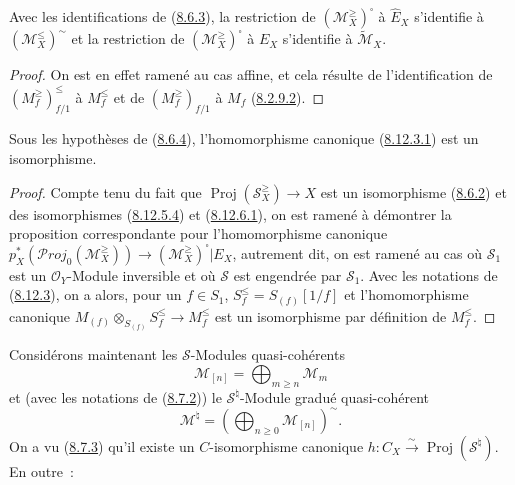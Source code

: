 \begin{corollary}[8.12.7]
\label{II.8.12.7-fr}
Avec les identifications de \textup{(\hyperref[II.8.6.3-fr]{8.6.3})}, la restriction
de $(\mathcal{M}_X^{\geq})^{\square}$ à $\widehat{E}_X$ s'identifie à
$(\mathcal{M}_X^{\leq})^{\sim}$ et la restriction de
$(\mathcal{M}_X^{\geq})^{\square}$ à $E_X$ s'identifie à
$\widetilde{\mathcal{M}}_X$.
\end{corollary}

\begin{proof}
On est en effet ramené au cas affine, et cela résulte de l'identification de
$(M_f^{\geq})_{f/1}^{\leq}$ à $M_f^{\leq}$ et de
$(M_f^{\geq})_{f/1}$ à $M_f$ (\hyperref[II.8.2.9.2-fr]{8.2.9.2}).
\end{proof}

\begin{proposition}[8.12.8]
\label{II.8.12.8-fr}
Sous les hypothèses de \textup{(\hyperref[II.8.6.4-fr]{8.6.4})}, l'homomorphisme
canonique \textup{(\hyperref[II.8.12.3.1-fr]{8.12.3.1})} est un isomorphisme.
\end{proposition}

\begin{proof}
Compte tenu du fait que $\operatorname{Proj}(\mathcal{S}_X^{\geq})\to X$
est un isomorphisme (\hyperref[II.8.6.2-fr]{8.6.2}) et des
isomorphismes (\hyperref[II.8.12.5.4-fr]{8.12.5.4}) et
(\hyperref[II.8.12.6.1-fr]{8.12.6.1}), on est ramené à démontrer la
proposition correspondante pour l'homomorphisme canonique
$p_X^*(\mathcal{P}\mathit{roj}_0(\mathcal{M}_X^{\geq}))
\to(\mathcal{M}_X^{\geq})^{\square}|E_X$, autrement dit, on est
ramené au cas où $\mathcal{S}_1$ est un $\mathcal{O}_Y$-Module inversible et
où $\mathcal{S}$ est engendrée par $\mathcal{S}_1$. Avec les notations de
(\hyperref[II.8.12.3-fr]{8.12.3}), on a alors, pour un $f\in S_1$,
$S_f^{\leq}=S_{(f)}[1/f]$ et l'homomorphisme canonique
$M_{(f)}\otimes_{S_{(f)}}S_f^{\leq}\to M_f^{\leq}$ est un isomorphisme par
définition de $M_f^{\leq}$.
\end{proof}

\begin{env}[8.12.9]
\label{II.8.12.9-fr}
Considérons maintenant les $\mathcal{S}$-Modules quasi-cohérents
\[
  \mathcal{M}_{[n]}=\bigoplus_{m\geqslant n}\mathcal{M}_m
\]
et (avec les notations de (\hyperref[II.8.7.2-fr]{8.7.2})) le
$\mathcal{S}^{\natural}$-Module gradué quasi-cohérent
\begin{equation}
\label{II.8.12.9.1-fr}
  \mathcal{M}^{\natural}
  =\left(\bigoplus_{n\geqslant0}\mathcal{M}_{[n]}\right)^{\sim}.
\tag{8.12.9.1}
\end{equation}
On a vu (\hyperref[II.8.7.3-fr]{8.7.3}) qu'il existe un $C$-isomorphisme
canonique $h:C_X\xrightarrow{\sim}\operatorname{Proj}(\mathcal{S}^{\natural})$.
En outre~:
\end{env}

